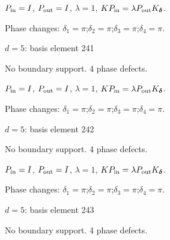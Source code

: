 \begin{center}
\end{center}
\vspace{-1mm}
$P_{\rm in}=I$, \quad $P_{\rm out}=I$, \quad $\lambda=1$, \qquad $K P_{\rm in}=\lambda P_{\rm out}K_{\boldsymbol\delta}$.
\par\smallskip\begin{minipage}{.98\linewidth}\small Phase changes: $\delta_{1}=\pi$;\quad $\delta_{2}=\pi$;\quad $\delta_{3}=\pi$;\quad $\delta_{4}=\pi$.\end{minipage}
\vfill
{\footnotesize\texttt{}}
\newpage
{}
{\Large $d=5$: basis element 241}\par
No boundary support. 4 phase defects.
\begin{center}
\end{center}
\vspace{-1mm}
$P_{\rm in}=I$, \quad $P_{\rm out}=I$, \quad $\lambda=1$, \qquad $K P_{\rm in}=\lambda P_{\rm out}K_{\boldsymbol\delta}$.
\par\smallskip\begin{minipage}{.98\linewidth}\small Phase changes: $\delta_{1}=\pi$;\quad $\delta_{2}=\pi$;\quad $\delta_{3}=\pi$;\quad $\delta_{4}=\pi$.\end{minipage}
\vfill
{\footnotesize\texttt{}}
\newpage
{}
{\Large $d=5$: basis element 242}\par
No boundary support. 4 phase defects.
\begin{center}
\end{center}
\vspace{-1mm}
$P_{\rm in}=I$, \quad $P_{\rm out}=I$, \quad $\lambda=1$, \qquad $K P_{\rm in}=\lambda P_{\rm out}K_{\boldsymbol\delta}$.
\par\smallskip\begin{minipage}{.98\linewidth}\small Phase changes: $\delta_{1}=\pi$;\quad $\delta_{2}=\pi$;\quad $\delta_{3}=\pi$;\quad $\delta_{4}=\pi$.\end{minipage}
\vfill
{\footnotesize\texttt{}}
\newpage
{}
{\Large $d=5$: basis element 243}\par
No boundary support. 4 phase defects.
\begin{center}
\end{center}
